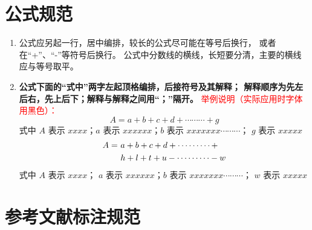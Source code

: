 \section{公式规范}

\begin{enumerate}
  \item 公式应另起一行，居中编排，较长的公式尽可能在等号后换行，
    或者在“+”、“-”等符号后换行。
    公式中分数线的横线，长短要分清，主要的横线应与等号取平。
  \item \textbf{公式下面的“式中”两字左起顶格编排，后接符号及其解释；
    解释顺序为先左后右，先上后下；解释与解释之间用“；”隔开。}
    \textcolor{red}{举例说明（实际应用时字体用黑色）：}
    {
    \color{red}
    \begin{equation}
      A = a + b + c + d + \cdots\cdots\cdots + g
    \end{equation}
      式中 $A$ 表示 $xxxx$；$a$ 表示 $xxxxxx$；$b$ 表示 $xxxxxxx\cdots\cdots\cdots$；
      $g$ 表示 $xxxxx$
    \begin{equation}
      \begin{split}
        \mathcolor{black}{A = & \ a + b + c + d + \cdots\cdots\cdots} + \\
        \mathcolor{black}{& \ h + l + t + u - \cdots\cdots\cdots - w}
      \end{split}
    \end{equation}
   式中 $A$ 表示 $xxxx$；
    $a$ 表示 $xxxxxx$；$b$ 表示 $xxxxxxx\cdots\cdots\cdots$；
    $w$ 表示 $xxxxx$
    }
\end{enumerate}

\section{参考文献标注规范}

